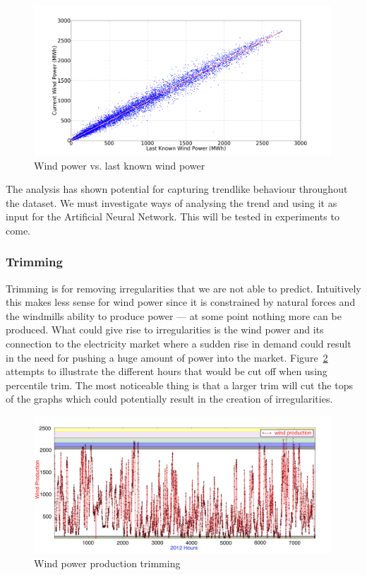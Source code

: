 \begin{figure}[ht!]
\centering
\includegraphics[width=0.99\textwidth]{billeder/windProductionVsLastWindProduction.png}
\caption{Wind power vs. last known wind power}
\label{fig:windProductionVsLastWindProduction}
\end{figure}

\noindent The analysis has shown potential for capturing trendlike behaviour throughout the dataset. We must investigate ways of analysing the trend and using it as input for the Artificial Neural Network. This will be tested in experiments to come.

\subsubsection{Trimming} 
Trimming is for removing irregularities that we are not able to predict. Intuitively this makes less sense for wind power since it is constrained by natural forces and the windmills ability to produce power --- at some point nothing more can be produced. What could give rise to irregularities is the wind power and its connection to the electricity market where a sudden rise in demand could result in the need for pushing a huge amount of power into the market. Figure~\ref{fig:windProductionTrimming} attempts to illustrate the different hours that would be cut off when using percentile trim. The most noticeable thing is that a larger trim will cut the tops of the graphs which could potentially result in the creation of irregularities. 

\begin{figure}[ht!]
\centering
\includegraphics[width=0.99\textwidth]{billeder/windProductionTrimming.jpg}
\caption{Wind power production trimming}
\label{fig:windProductionTrimming}
\end{figure}


